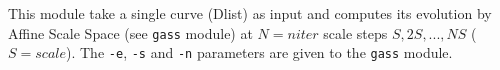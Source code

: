 This module take a single curve (Dlist) as input and computes its evolution
by Affine Scale Space 
(see \verb+gass+ module) at $N=niter$ scale steps
$S,2S,...,NS$ ($S=scale$). The \verb+-e+, \verb+-s+ and \verb+-n+ parameters
are given to the \verb+gass+ module. 
